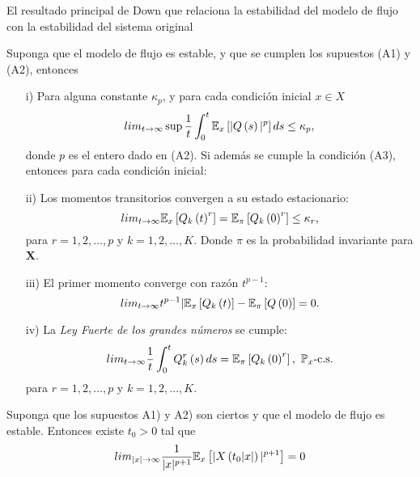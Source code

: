 El resultado principal de Down \cite{Down} que relaciona la estabilidad del modelo de flujo con la estabilidad del sistema original

\begin{Teo}\label{Tma.2.1.Down}
Suponga que el modelo de flujo es estable, y que se cumplen los supuestos (A1) y (A2), entonces
\begin{itemize}
\item[i)] Para alguna constante $\kappa_{p}$, y para cada
condici\'on inicial $x\in X$
\begin{equation}\label{Estability.Eq1}
lim_{t\rightarrow\infty}\sup\frac{1}{t}\int_{0}^{t}\mathbb{E}_{x}\left[|Q\left(s\right)|^{p}\right]ds\leq\kappa_{p},
\end{equation}
donde $p$ es el entero dado en (A2). Si adem\'as se cumple
la condici\'on (A3), entonces para cada condici\'on inicial:

\item[ii)] Los momentos transitorios convergen a su estado estacionario:
 \begin{equation}\label{Estability.Eq2}
lim_{t\rightarrow\infty}\mathbb{E}_{x}\left[Q_{k}\left(t\right)^{r}\right]=\mathbb{E}_{\pi}\left[Q_{k}\left(0\right)^{r}\right]\leq\kappa_{r},
\end{equation}
para $r=1,2,\ldots,p$ y $k=1,2,\ldots,K$. Donde $\pi$ es la
probabilidad invariante para $\mathbf{X}$.

\item[iii)]  El primer momento converge con raz\'on $t^{p-1}$:
\begin{equation}\label{Estability.Eq3}
lim_{t\rightarrow\infty}t^{p-1}|\mathbb{E}_{x}\left[Q_{k}\left(t\right)\right]-\mathbb{E}_{\pi}\left[Q\left(0\right)\right]=0.
\end{equation}

\item[iv)] La {\em Ley Fuerte de los grandes n\'umeros} se cumple:
\begin{equation}\label{Estability.Eq4}
lim_{t\rightarrow\infty}\frac{1}{t}\int_{0}^{t}Q_{k}^{r}\left(s\right)ds=\mathbb{E}_{\pi}\left[Q_{k}\left(0\right)^{r}\right],\textrm{
}\mathbb{P}_{x}\textrm{-c.s.}
\end{equation}
para $r=1,2,\ldots,p$ y $k=1,2,\ldots,K$.
\end{itemize}
\end{Teo}


\begin{Prop}\label{Prop.5.1.DaiSean}
Suponga que los supuestos A1) y A2) son ciertos y que el modelo de flujo es estable. Entonces existe $t_{0}>0$ tal que
\begin{equation}
lim_{|x|\rightarrow\infty}\frac{1}{|x|^{p+1}}\mathbb{E}_{x}\left[|X\left(t_{0}|x|\right)|^{p+1}\right]=0
\end{equation}
\end{Prop}

